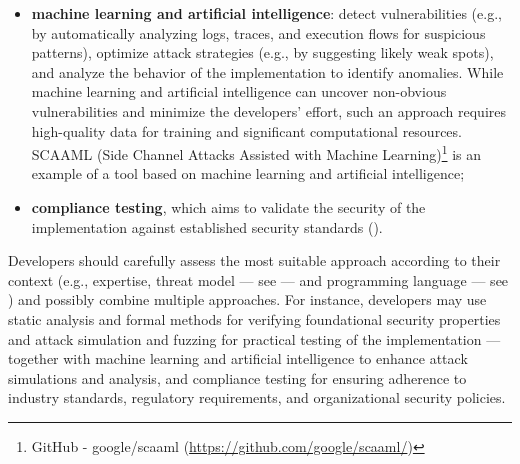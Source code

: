 \begin{itemize}
	\item \textbf{machine learning and artificial intelligence}: detect vulnerabilities (e.g., by automatically analyzing logs, traces, and execution flows for suspicious patterns), optimize attack strategies (e.g., by suggesting likely weak spots), and analyze the behavior of the implementation to identify anomalies. While machine learning and artificial intelligence can uncover non-obvious vulnerabilities and minimize the developers' effort, such an approach requires high-quality data for training and significant computational resources. SCAAML (Side Channel Attacks Assisted with Machine Learning)\footnote{GitHub - google/scaaml (\url{https://github.com/google/scaaml/})} is an example of a tool based on machine learning and artificial intelligence;
		
	\item \textbf{compliance testing}, which aims to validate the security of the implementation against established security standards ().
		
\end{itemize}

Developers should carefully assess the most suitable approach according to their context (e.g., expertise, threat model --- see  --- and programming language --- see ) and possibly combine multiple approaches. For instance, developers may use static analysis and formal methods for verifying foundational security properties and attack simulation and fuzzing for practical testing of the implementation --- together with machine learning and artificial intelligence to enhance attack simulations and analysis, and compliance testing for ensuring adherence to industry standards, regulatory requirements, and organizational security policies. 



